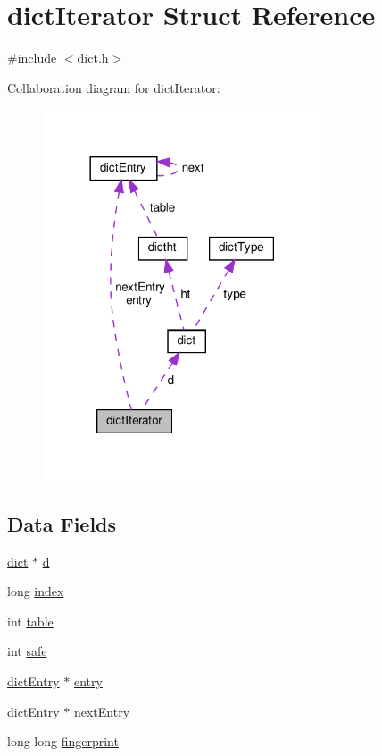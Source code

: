 \hypertarget{structdict_iterator}{}\section{dict\+Iterator Struct Reference}
\label{structdict_iterator}


{\ttfamily \#include $<$dict.\+h$>$}



Collaboration diagram for dict\+Iterator\+:
\nopagebreak
\begin{figure}[H]
\begin{center}
\leavevmode
\includegraphics[width=234pt]{structdict_iterator__coll__graph}
\end{center}
\end{figure}
\subsection*{Data Fields}
\begin{DoxyCompactItemize}
\item 
\hyperlink{structdict}{dict} $\ast$ \hyperlink{structdict_iterator_a33c1b4f71e1cd72f4a8e828584426f49}{d}
\item 
long \hyperlink{structdict_iterator_a5d2f8fec06b0a536e0c8cbd1c0b64e09}{index}
\item 
int \hyperlink{structdict_iterator_a381b3daa303e1bdbac3a7b7000e0176c}{table}
\item 
int \hyperlink{structdict_iterator_a3165c7b86c85463f7d64defedf6b0d43}{safe}
\item 
\hyperlink{structdict_entry}{dict\+Entry} $\ast$ \hyperlink{structdict_iterator_aded8f8ee1a8ba420d3165db8ee65c26b}{entry}
\item 
\hyperlink{structdict_entry}{dict\+Entry} $\ast$ \hyperlink{structdict_iterator_a21d7b69d1530abaedbfd8df260733769}{next\+Entry}
\item 
long long \hyperlink{structdict_iterator_ae69415fa6d28d5311ba7ee5c24277398}{fingerprint}
\end{DoxyCompactItemize}


